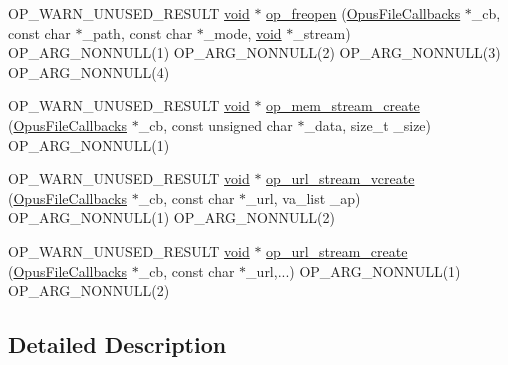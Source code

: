 \begin{DoxyCompactItemize}
\item 
O\+P\+\_\+\+W\+A\+R\+N\+\_\+\+U\+N\+U\+S\+E\+D\+\_\+\+R\+E\+S\+U\+LT \mbox{\hyperlink{_s_d_l__opengles2__gl2ext_8h_ae5d8fa23ad07c48bb609509eae494c95}{void}} $\ast$ \mbox{\hyperlink{group__stream__callbacks_gae63ceff71d9602c68f4db1c91b480fde}{op\+\_\+freopen}} (\mbox{\hyperlink{struct_opus_file_callbacks}{Opus\+File\+Callbacks}} $\ast$\+\_\+cb, const char $\ast$\+\_\+path, const char $\ast$\+\_\+mode, \mbox{\hyperlink{_s_d_l__opengles2__gl2ext_8h_ae5d8fa23ad07c48bb609509eae494c95}{void}} $\ast$\+\_\+stream) O\+P\+\_\+\+A\+R\+G\+\_\+\+N\+O\+N\+N\+U\+LL(1) O\+P\+\_\+\+A\+R\+G\+\_\+\+N\+O\+N\+N\+U\+LL(2) O\+P\+\_\+\+A\+R\+G\+\_\+\+N\+O\+N\+N\+U\+LL(3) O\+P\+\_\+\+A\+R\+G\+\_\+\+N\+O\+N\+N\+U\+LL(4)
\item 
O\+P\+\_\+\+W\+A\+R\+N\+\_\+\+U\+N\+U\+S\+E\+D\+\_\+\+R\+E\+S\+U\+LT \mbox{\hyperlink{_s_d_l__opengles2__gl2ext_8h_ae5d8fa23ad07c48bb609509eae494c95}{void}} $\ast$ \mbox{\hyperlink{group__stream__callbacks_ga83231f1733af83c7940b0262f1a1ffb5}{op\+\_\+mem\+\_\+stream\+\_\+create}} (\mbox{\hyperlink{struct_opus_file_callbacks}{Opus\+File\+Callbacks}} $\ast$\+\_\+cb, const unsigned char $\ast$\+\_\+data, size\+\_\+t \+\_\+size) O\+P\+\_\+\+A\+R\+G\+\_\+\+N\+O\+N\+N\+U\+LL(1)
\item 
O\+P\+\_\+\+W\+A\+R\+N\+\_\+\+U\+N\+U\+S\+E\+D\+\_\+\+R\+E\+S\+U\+LT \mbox{\hyperlink{_s_d_l__opengles2__gl2ext_8h_ae5d8fa23ad07c48bb609509eae494c95}{void}} $\ast$ \mbox{\hyperlink{group__stream__callbacks_ga33bf9edd6949f8125456b2c8a1591010}{op\+\_\+url\+\_\+stream\+\_\+vcreate}} (\mbox{\hyperlink{struct_opus_file_callbacks}{Opus\+File\+Callbacks}} $\ast$\+\_\+cb, const char $\ast$\+\_\+url, va\+\_\+list \+\_\+ap) O\+P\+\_\+\+A\+R\+G\+\_\+\+N\+O\+N\+N\+U\+LL(1) O\+P\+\_\+\+A\+R\+G\+\_\+\+N\+O\+N\+N\+U\+LL(2)
\item 
O\+P\+\_\+\+W\+A\+R\+N\+\_\+\+U\+N\+U\+S\+E\+D\+\_\+\+R\+E\+S\+U\+LT \mbox{\hyperlink{_s_d_l__opengles2__gl2ext_8h_ae5d8fa23ad07c48bb609509eae494c95}{void}} $\ast$ \mbox{\hyperlink{group__stream__callbacks_ga5c588fac7542057282b50a5bd2dbb35a}{op\+\_\+url\+\_\+stream\+\_\+create}} (\mbox{\hyperlink{struct_opus_file_callbacks}{Opus\+File\+Callbacks}} $\ast$\+\_\+cb, const char $\ast$\+\_\+url,...) O\+P\+\_\+\+A\+R\+G\+\_\+\+N\+O\+N\+N\+U\+LL(1) O\+P\+\_\+\+A\+R\+G\+\_\+\+N\+O\+N\+N\+U\+LL(2)
\end{DoxyCompactItemize}


\subsection{Detailed Description}



